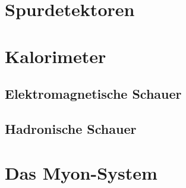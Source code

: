 \section{Spurdetektoren}

\section{Kalorimeter}

\subsection{Elektromagnetische Schauer}

\subsection{Hadronische Schauer}

\section{Das Myon-System}
